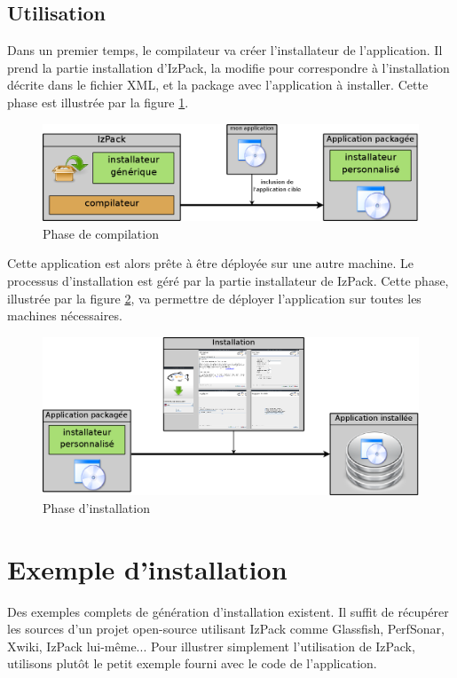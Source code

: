 \subsection{Utilisation}
Dans un premier temps, le compilateur va créer l'installateur de l'application.
Il prend la partie installation d'IzPack, la modifie pour correspondre à l'installation décrite dans le fichier XML, et la package avec l'application à installer. Cette phase est illustrée par la figure \ref{fig:partie_compil}.
\begin{figure}[H]
	\centering
	\includegraphics[width=\textwidth]{../image/partie_compil.png}
	\caption{Phase de compilation}
	\label{fig:partie_compil}
\end{figure}

Cette application est alors prête à être déployée sur une autre machine.
Le processus d'installation est géré par la partie installateur de IzPack.
Cette phase, illustrée par la figure \ref{fig:partie_install}, va permettre de déployer l'application sur toutes les machines nécessaires.
\begin{figure}[H]
	\centering
	\includegraphics[width=\textwidth]{../image/partie_install.png}
	\caption{Phase d'installation}
	\label{fig:partie_install}
\end{figure}

\section{Exemple d'installation}
Des exemples complets de génération d'installation existent.
Il suffit de récupérer les sources d'un projet open-source utilisant IzPack comme Glassfish, PerfSonar, Xwiki, IzPack lui-même... 
Pour illustrer simplement l'utilisation de IzPack, utilisons plutôt le petit exemple fourni avec le code de l'application.
